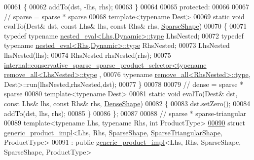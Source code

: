 \begin{DoxyCode}
00061   \{
00062     addTo(dst, -lhs, rhs);
00063   \}
00064 
00065 \textcolor{keyword}{protected}:
00066 
00067   \textcolor{comment}{// sparse = sparse * sparse}
00068   \textcolor{keyword}{template}<\textcolor{keyword}{typename} Dest>
00069   \textcolor{keyword}{static} \textcolor{keywordtype}{void} evalTo(Dest& dst, \textcolor{keyword}{const} Lhs& lhs, \textcolor{keyword}{const} Rhs& rhs, \hyperlink{struct_eigen_1_1_sparse_shape}{SparseShape})
00070   \{
00071     \textcolor{keyword}{typedef} \textcolor{keyword}{typename} \hyperlink{class_eigen_1_1internal_1_1_tensor_lazy_evaluator_writable}{nested\_eval<Lhs,Dynamic>::type} LhsNested;
00072     \textcolor{keyword}{typedef} \textcolor{keyword}{typename} \hyperlink{class_eigen_1_1internal_1_1_tensor_lazy_evaluator_writable}{nested\_eval<Rhs,Dynamic>::type} RhsNested;
00073     LhsNested lhsNested(lhs);
00074     RhsNested rhsNested(rhs);
00075     
      \hyperlink{struct_eigen_1_1internal_1_1conservative__sparse__sparse__product__selector}{internal::conservative\_sparse\_sparse\_product\_selector<typename remove\_all<LhsNested>::type}
      ,
00076                                                           \textcolor{keyword}{typename} 
      \hyperlink{group___sparse_core___module}{remove\_all<RhsNested>::type}, Dest>::run(lhsNested,rhsNested,dst);
00077   \}
00078 
00079   \textcolor{comment}{// dense = sparse * sparse}
00080   \textcolor{keyword}{template}<\textcolor{keyword}{typename} Dest>
00081   \textcolor{keyword}{static} \textcolor{keywordtype}{void} evalTo(Dest& dst, \textcolor{keyword}{const} Lhs& lhs, \textcolor{keyword}{const} Rhs& rhs, \hyperlink{struct_eigen_1_1_dense_shape}{DenseShape})
00082   \{
00083     dst.setZero();
00084     addTo(dst, lhs, rhs);
00085   \}
00086 \};
00087 
00088 \textcolor{comment}{// sparse * sparse-triangular}
00089 \textcolor{keyword}{template}<\textcolor{keyword}{typename} Lhs, \textcolor{keyword}{typename} Rhs, \textcolor{keywordtype}{int} ProductType>
\hyperlink{struct_eigen_1_1internal_1_1generic__product__impl_3_01_lhs_00_01_rhs_00_01_sparse_shape_00_01_s05ccb218a557b35cabc12ad35cb16218}{00090} \textcolor{keyword}{struct }\hyperlink{struct_eigen_1_1internal_1_1generic__product__impl}{generic\_product\_impl}<Lhs, Rhs, \hyperlink{struct_eigen_1_1_sparse_shape}{SparseShape}, 
      \hyperlink{struct_eigen_1_1internal_1_1_sparse_triangular_shape}{SparseTriangularShape}, ProductType>
00091  : \textcolor{keyword}{public} \hyperlink{struct_eigen_1_1internal_1_1generic__product__impl}{generic\_product\_impl}<Lhs, Rhs, SparseShape, SparseShape, ProductType>

\end{DoxyCode}
